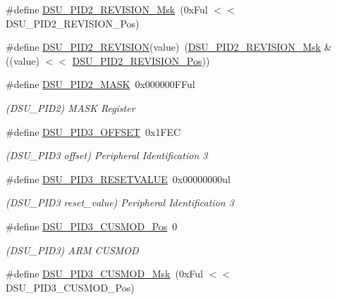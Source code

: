 \begin{DoxyCompactItemize}
\#define \mbox{\hyperlink{group___s_a_m_d21___d_s_u_ga82145131b9b62c23c97969def2900d5d}{D\+S\+U\+\_\+\+P\+I\+D2\+\_\+\+R\+E\+V\+I\+S\+I\+O\+N\+\_\+\+Msk}}~(0x\+Ful $<$$<$ D\+S\+U\+\_\+\+P\+I\+D2\+\_\+\+R\+E\+V\+I\+S\+I\+O\+N\+\_\+\+Pos)
\item 
\#define \mbox{\hyperlink{group___s_a_m_d21___d_s_u_ga2aded9774af773c83f88843254b3921b}{D\+S\+U\+\_\+\+P\+I\+D2\+\_\+\+R\+E\+V\+I\+S\+I\+ON}}(value)~(\mbox{\hyperlink{group___s_a_m_d21___d_s_u_ga82145131b9b62c23c97969def2900d5d}{D\+S\+U\+\_\+\+P\+I\+D2\+\_\+\+R\+E\+V\+I\+S\+I\+O\+N\+\_\+\+Msk}} \& ((value) $<$$<$ \mbox{\hyperlink{group___s_a_m_d21___d_s_u_gacb24de7b25b93dd1c040ed75899fd545}{D\+S\+U\+\_\+\+P\+I\+D2\+\_\+\+R\+E\+V\+I\+S\+I\+O\+N\+\_\+\+Pos}}))
\item 
\#define \mbox{\hyperlink{group___s_a_m_d21___d_s_u_ga4166d965b2c546c98a12d698fd27aa37}{D\+S\+U\+\_\+\+P\+I\+D2\+\_\+\+M\+A\+SK}}~0x000000\+F\+Ful
\begin{DoxyCompactList}\small\item\em (D\+S\+U\+\_\+\+P\+I\+D2) M\+A\+SK Register \end{DoxyCompactList}\item 
\#define \mbox{\hyperlink{group___s_a_m_d21___d_s_u_ga0dadf53ca912be72cc37e2eddedbacfa}{D\+S\+U\+\_\+\+P\+I\+D3\+\_\+\+O\+F\+F\+S\+ET}}~0x1\+F\+EC
\begin{DoxyCompactList}\small\item\em (D\+S\+U\+\_\+\+P\+I\+D3 offset) Peripheral Identification 3 \end{DoxyCompactList}\item 
\#define \mbox{\hyperlink{group___s_a_m_d21___d_s_u_gaaf4259207024e68a7734aa815f281bb2}{D\+S\+U\+\_\+\+P\+I\+D3\+\_\+\+R\+E\+S\+E\+T\+V\+A\+L\+UE}}~0x00000000ul
\begin{DoxyCompactList}\small\item\em (D\+S\+U\+\_\+\+P\+I\+D3 reset\+\_\+value) Peripheral Identification 3 \end{DoxyCompactList}\item 
\#define \mbox{\hyperlink{group___s_a_m_d21___d_s_u_gab4e2a84699bcb677236554a721bbe8f4}{D\+S\+U\+\_\+\+P\+I\+D3\+\_\+\+C\+U\+S\+M\+O\+D\+\_\+\+Pos}}~0
\begin{DoxyCompactList}\small\item\em (D\+S\+U\+\_\+\+P\+I\+D3) A\+RM C\+U\+S\+M\+OD \end{DoxyCompactList}\item 
\#define \mbox{\hyperlink{group___s_a_m_d21___d_s_u_ga42edeb1d05942c2e02601a8e1abebdaa}{D\+S\+U\+\_\+\+P\+I\+D3\+\_\+\+C\+U\+S\+M\+O\+D\+\_\+\+Msk}}~(0x\+Ful $<$$<$ D\+S\+U\+\_\+\+P\+I\+D3\+\_\+\+C\+U\+S\+M\+O\+D\+\_\+\+Pos)
$$
\end{DoxyCompactItemize}
